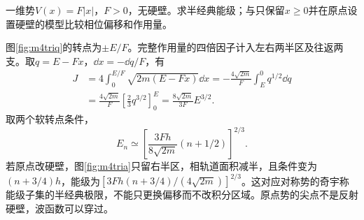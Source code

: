 \begin{example}\label{ex:m4triangular}
一维势$V(x)=F|x|$，$F>0$，无硬壁。求半经典能级；与只保留$x\geq0$并在原点设置硬壁的模型比较相位偏移和作用量。
\end{example}
\begin{solution}
图\ref{fig:m4triq}的转点为$\pm E/F$。完整作用量的四倍因子计入左右两半区及往返两支。取$q=E-Fx$，$\dd x=-\dd q/F$，有
\begin{align*}
 J&=4\int_0^{E/F}\sqrt{2m(E-Fx)}\dd x
 =-\frac{4\sqrt{2m}}F\int_E^0q^{1/2}\dd q\\
 &=\frac{4\sqrt{2m}}F\left[\frac23q^{3/2}\right]_0^E
 =\frac{8\sqrt{2m}}{3F}E^{3/2}.
\end{align*}
取两个软转点条件，
\[
 E_n\simeq\left[\frac{3Fh}{8\sqrt{2m}}(n+1/2)\right]^{2/3}.
\]
若原点改硬壁，图\ref{fig:m4tria}只留右半区，相轨道面积减半，且条件变为$(n+3/4)h$，能级为$[3Fh(n+3/4)/(4\sqrt{2m})]^{2/3}$。这对应对称势的奇宇称能级子集的半经典极限，不能只更换偏移而不改积分区域。原点势的尖点不是反射硬壁，波函数可以穿过。
\end{solution}

